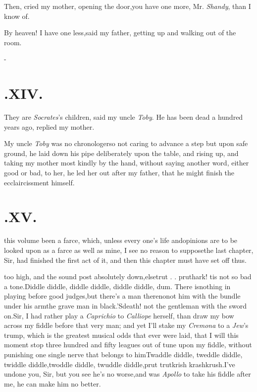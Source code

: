 \documentclass{article}
\begin{document}
\vskip -2pt

\tsh  Then, cried my mother, opening the
door,\tsh you have one more, Mr. \textit{Shandy}, than I
know of.

\vskip -2pt

By heaven! I have one less,\tsk said my father, getting up and
walking out of the room.

\setlength{\baselineskip}{12.78pt}  %
\null\kern-\baselineskip
\section{.\enspace  XIV.}

\quad\tsh They are \textit{Socrates}’s children, said my uncle
\textit{Toby}. He has been dead a hundred years ago, replied my
mother.

My uncle \textit{Toby} was no chronologer\tsk so not caring to
advance a step but upon safe ground, he laid down his pipe
deliberately upon the table, and rising up, and taking my mother
most kindly by the hand, without saying another word, either good
or bad, to her, he led her out after my father, that he might
finish the ecclaircissment himself.

\section{.\enspace  XV.}

 this volume been a farce,\break
which, unless every one’s life and\break opinions are to be looked upon as
a farce as well as mine, I see no reason to suppose\tsk the last
chapter, Sir, had finished
the first act of it, and then this
chapter must have set off thus.

\noindent
{}
too high, and the sound post absolutely
down,\tsk else\tsk trut . . prut\tsk hark! tis not so bad a
tone.\tsk Diddle diddle, diddle diddle, diddle diddle, dum.
There is\break nothing
in playing before good judges,\tsk but there’s a man
there\tsk no\tsk not him with the bundle under his arm\tsk the grave man
in black.\tsk ’Sdeath! not the gentleman with the sword on.\tsk Sir,
I had rather play a \textit{Caprichio} to \textit{Calliope} herself, than draw my
bow across my fiddle before that very man; and yet I’ll stake my
\textit{Cremona} to a \textit{Jew}’s trump, which is the greatest musical
odds that ever were laid, that I will this moment stop three hundred and fifty
leagues out of tune upon my fiddle, without punish\-ing one single nerve that
belongs to him\break\tsk Twaddle diddle, tweddle
diddle,\tsk\break
twiddle diddle,\tsk twoddle diddle,\tsk\break
twuddle diddle,\tsh prut trut\tsk krish\tsk\break
krash\tsk krush.\tsk I’ve undone you, Sir,\break
\tsk but you see he’s no worse,\tsk and was \textit{Apollo} to take
his fiddle after me, he can make him no better.
\end{document}
